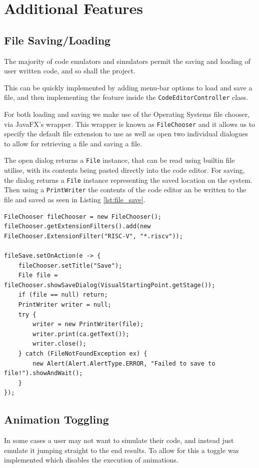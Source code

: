 \section{Additional Features}\label{sec:add_feat}
\subsection{File Saving/Loading}
The majority of code emulators and simulators permit the saving and loading of user written code, and so shall the project.

This can be quickly implemented by adding menu-bar options to load and save a file, and then implementing the feature inside the \texttt{CodeEditorController} class.

For both loading and saving we make use of the Operating Systems file chooser, via JavaFX's \cite{sunmicrosystems_2022_javafx} wrapper. This wrapper is known as \texttt{FileChooser} and it allows us to specify the default file extension to use as well as open two individual dialogues to allow for retrieving a file and saving a file.

The open dialog returns a \texttt{File} instance, that can be read using builtin file utilise, with its contents being pasted directly into the code editor. For saving, the dialog returns a \texttt{File} instance representing the saved location on the system. Then using a \texttt{PrintWriter} the contents of the code editor an be written to the file and saved as seen in Listing \ref{lst:file_save}.

\begin{lstlisting}[caption=File saving implementation using \texttt{FileChooser}, label=lst:file_save]
FileChooser fileChooser = new FileChooser();
fileChooser.getExtensionFilters().add(new FileChooser.ExtensionFilter("RISC-V", "*.riscv"));

fileSave.setOnAction(e -> {
    fileChooser.setTitle("Save");
    File file = fileChooser.showSaveDialog(VisualStartingPoint.getStage());
    if (file == null) return;
    PrintWriter writer = null;
    try {
        writer = new PrintWriter(file);
        writer.print(ca.getText());
        writer.close();
    } catch (FileNotFoundException ex) {
        new Alert(Alert.AlertType.ERROR, "Failed to save to file!").showAndWait();
    }
});
\end{lstlisting}

\subsection{Animation Toggling}
In some cases a user may not want to simulate their code, and instead just emulate it jumping straight to the end results. To allow for this a toggle was implemented which disables the execution of animations.

